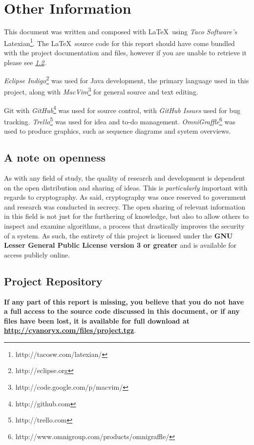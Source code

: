 \section{Other Information}

This document was written and composed with \LaTeX \ using \emph{Taco Software's} Latexian\footnote{http://tacosw.com/latexian/}. The \LaTeX \ source code for this report should have come bundled with the project documentation and files, however if you are unable to retrieve it please see \emph{\textsection \ref{sec:project_repo}}.

\emph{Eclipse Indigo}\footnote{http://eclipse.org} was used for Java development, the primary language used in this project, along with \emph{MacVim}\footnote{http://code.google.com/p/macvim/} for general source and text editing.

Git with \emph{GitHub}\footnote{http://github.com} was used for source control, with \emph{GitHub Issues} used for bug tracking. \emph{Trello}\footnote{http://trello.com} was used for idea and to-do management. \emph{OmniGraffle}\footnote{http://www.omnigroup.com/products/omnigraffle/} was used to produce graphics, such as sequence diagrams and system overviews.

\subsection{A note on openness}

As with any field of study, the quality of research and development is dependent on the open distribution and sharing of ideas. This is \emph{particularly} important with regards to cryptography. As said, cryptography was once reserved to government and research was conducted in secrecy. The open sharing of relevant information in this field is not just for the furthering of knowledge, but also to allow others to inspect and examine algorithms, a process that drastically improves the security of a system. As such, the entirety of this project is licensed under the \textbf{GNU Lesser General Public License version 3 or greater} and is available for access publicly online.

\subsection{Project Repository}
\label{sec:project_repo}

\textbf{If any part of this report is missing, you believe that you do not have a full access to the source code discussed in this document, or if any files have been lost, it is available for full download at \url{http://cyanoryx.com/files/project.tgz}}. 